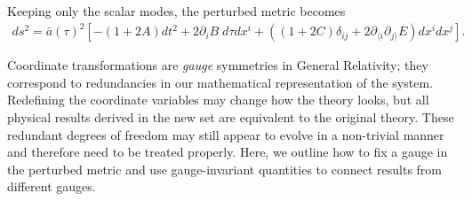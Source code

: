 Keeping only the scalar modes, the perturbed metric becomes
\begin{align}
	ds^2 = \bar{a}(\tau)^2 \left[ -(1+2A) dt^2 + 2 \partial_i B \; d\tau dx^i + \left( (1+2C)\delta_{ij} + 2\partial_{\langle i}\partial_{j \rangle} E \right) dx^i dx^j \right]. \label{eqn:perturbed_metric_scalar}
\end{align}

Coordinate transformations are \textit{gauge} symmetries in General Relativity; they correspond to redundancies in our mathematical representation of the system. Redefining the coordinate variables may change how the theory looks, but all physical results derived in the new set are equivalent to the original theory. These redundant degrees of freedom may still appear to evolve in a non-trivial manner and therefore need to be treated properly. Here, we outline how to fix a gauge in the perturbed metric and use gauge-invariant quantities to connect results from different gauges.

